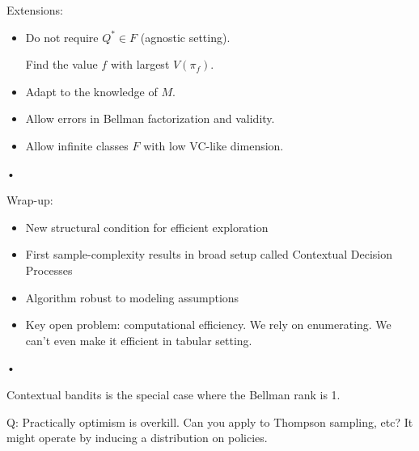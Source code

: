 %
%
Extensions:
\begin{itemize}
\item
Do not require $Q^*\in F$ (agnostic setting).

Find the value $f$ with largest $V(\pi_f)$.
\item
Adapt to the knowledge of $M$.
\item
Allow errors in Bellman factorization and validity.
\item
Allow infinite classes $F$ with low VC-like dimension.
\end{itemize}•


Wrap-up:
\begin{itemize}
\item
New structural condition for efficient exploration
\item
First sample-complexity results in broad setup called Contextual Decision Processes
\item
Algorithm robust to modeling assumptions
\item
Key open problem: computational efficiency. We rely on enumerating. We can't even make it efficient in tabular setting.
\end{itemize}•


Contextual bandits is the special case where the Bellman rank is 1.

%

Q: Practically optimism is overkill. Can you apply to Thompson sampling, etc?
It might operate by inducing a distribution on policies.

